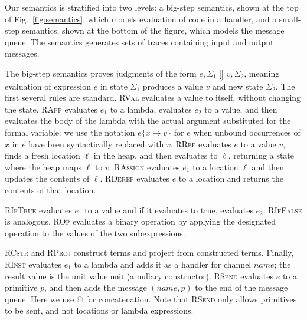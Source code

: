 \documentclass{llncs}
\newcommand{\code}[1]{\textsf{#1}} %
\newcommand{\aset}[1]{\{#1\}}
\newcommand{\sfmt}[1]{\textsf{#1}}
\newcommand{\sch}{\textit{name}}
\newcommand{\loc}{\ell}
\newcommand{\sunit}{\sfmt{unit}}
\newcommand{\sreduce}{\Downarrow}
\newcommand{\xv}{p}
\newcommand{\comment}[3][\color{red}]{{#1{[{#2}: {#3}]}}}
\newcommand{\kris}[1]{\comment[\color{orange}]{kris}{#1}}
\newcommand{\mrc}[1]{\comment[\color{blue}]{MRC}{#1}}
\begin{document}
Our semantics is stratified into two levels: a big-step semantics,
shown at the top of Fig.~\ref{fig:semantics}, which models evaluation of code in a
handler, and a small-step semantics, shown at the bottom of the
figure, which models the message queue.  The semantics generates sets
of traces containing input and output messages.


The big-step semantics proves judgments of the form
$e, \Sigma_1 \sreduce v, \Sigma_2$, meaning
evaluation of expression $e$ in state $\Sigma_1$ produces a value $v$ and
new state $\Sigma_2$. 
The first several rules are standard.
\textsc{RVal} evaluates a value to itself, without changing the
state. \textsc{RApp} evaluates $e_1$ to a lambda, evaluates $e_2$ to
a value, and then evaluates the body of the lambda with the actual
argument substituted for the formal variable: we use the notation
$e\aset{x\mapsto v}$ for $e$ when unbound occurrences of $x$ in $e$
have been syntactically replaced with $v$. 
\textsc{RRef} evaluates $e$ to a value $v$, finds a fresh location
$\loc$ in the heap, and then evaluates to $\loc$, returning a state
where the heap maps $\loc$ to $v$. \textsc{RAssign} evaluates $e_1$
to a location $\loc$ and then updates the contents of
$\loc$. \textsc{RDeref} evaluates $e$ to a location and returns the
contents of that location.

\textsc{RIfTrue} evaluates $e_1$ to a value and if it evaluates to
\code{true}, evaluates $e_2$. \textsc{RIfFalse} is
analogous.
\textsc{ROp} evaluates a binary operation by applying the designated
operation to the values of the two subexpressions.

\textsc{RCstr} and \textsc{RProj} construct terms and project from
constructed terms. Finally, \textsc{RInst} evaluates $e_1$ to a lambda
and adds it as a handler for channel $\sch$; the result value is the
unit value $\sunit$ (a nullary constructor). \textsc{RSend} evaluates
$e$ to a primitive $\xv$, and then adds the message $(\sch,\xv)$ to the
end of the message queue. Here we use $@$ for concatenation. Note that \textsc{RSend} only allows
primitives to be sent, and not locations or lambda
expressions.
\end{document}
